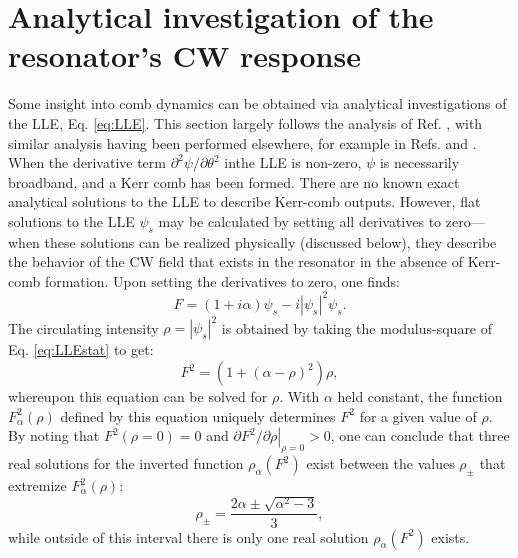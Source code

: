 \section{Analytical investigation of the resonator's CW response}
Some insight into comb dynamics can be obtained via analytical investigations of the LLE, Eq. \ref{eq:LLE}. This section largely follows the analysis of Ref. \cite{Godey2014}, with similar analysis having been performed elsewhere, for example in Refs. \cite{Coen2013a} and \cite{Barashenkov1996}. When the derivative term $\partial^2\psi/\partial\theta^2$ inthe LLE is non-zero, $\psi$ is necessarily broadband, and a Kerr comb has been formed. There are no known exact analytical solutions to the LLE to describe Kerr-comb outputs. However, flat solutions to the LLE $\psi_s$ may be calculated by setting all derivatives to zero---when these solutions can be realized physically (discussed below), they describe the behavior of the CW field that exists in the resonator in the absence of Kerr-comb formation. Upon setting the derivatives to zero, one finds:
\begin{equation}
F=(1+i\alpha)\psi_s-i|\psi_s|^2\psi_s. \label{eq:LLEstat}
\end{equation}
The circulating intensity $\rho=|\psi_s|^2$ is obtained by taking the modulus-square of Eq. \ref{eq:LLEstat} to get:
\begin{equation}
F^2=\left(1+(\alpha-\rho)^2\right)\rho\label{eq:LLEstat2},
\end{equation} 
whereupon this equation can be solved for $\rho$. With $\alpha$ held constant, the function $F^2_\alpha(\rho)$ defined by this equation uniquely determines $F^2$ for a given value of $\rho$. By noting that $F^2(\rho=0)=0$ and $\left.\partial F^2/\partial \rho\right|_{\rho=0}>0$, one can conclude that three real solutions for the inverted function $\rho_\alpha(F^2)$ exist between the values $\rho_\pm$ that extremize $F^2_\alpha(\rho)$:
\begin{equation}
\rho_\pm=\frac{2\alpha\pm\sqrt{\alpha^2-3}}{3},\label{eq:rhopm}
\end{equation}
while outside of this interval there is only one real solution $\rho_\alpha(F^2)$ exists.

